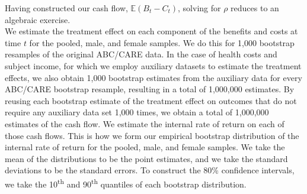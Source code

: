 \noindent Having constructed our cash flow, $\mathbb{E} (B_t - C_t)$, solving for $\rho$
reduces to an algebraic exercise.\\

\noindent We estimate the treatment effect on each
component of the benefits and costs at time $t$ for the pooled, male, and
female samples. We do this for 1,000 bootstrap resamples of the original ABC/CARE data.
In the case of health costs and subject income, for which we employ auxiliary datasets to
estimate the treatment effects, we also obtain 1,000 bootstrap estimates from the auxiliary data
for every ABC/CARE bootstrap resample, resulting in a total of 1,000,000 estimates.
By reusing each bootstrap estimate of the treatment effect on outcomes that do not require any auxiliary data
set 1,000 times, we obtain a total of 1,000,000 estimates of the cash flow.
We estimate the internal rate of return on each of those cash flows.
This is how we form our empirical bootstrap distribution of the internal rate of return for the pooled, male, and female samples.
We take the mean of the distributions to be the point estimates, and we take the standard deviations
to be the standard errors. To construct the 80\% confidence intervals, we take the 10\textsuperscript{th}
and 90\textsuperscript{th} quantiles of each bootstrap distribution. \\





